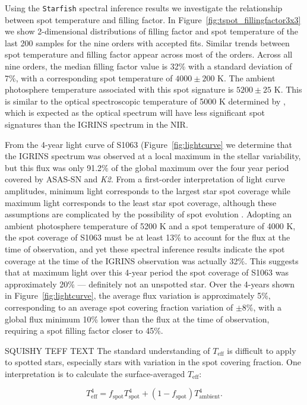 \documentclass[twocolumn]{emulateapj}%
\begin{document}
Using the \texttt{Starfish} spectral inference results we investigate the relationship between spot temperature and filling factor. In Figure~\ref{fig:tspot_fillingfactor3x3} we show 2-dimensional distributions of filling factor and spot temperature of the last 200 samples for the nine orders with accepted fits. Similar trends between spot temperature and filling factor appear across most of the orders. Across all nine orders, the median filling factor value is 32\% with a standard deviation of 7\%, with a corresponding spot temperature of $4000 \pm 200$ K. The ambient photosphere temperature associated with this spot signature is $5200\pm25$ K. This is similar to the optical spectroscopic temperature of 5000 K determined by \citet{mathieu03}, which is expected as the optical spectrum will have less significant spot signatures than the IGRINS spectrum in the NIR.

From the 4-year light curve of S1063 (Figure~\ref{fig:lightcurve} we determine that the IGRINS spectrum was observed at a local maximum in the stellar variability, but this flux was only 91.2\% of the global maximum over the four year period covered by ASAS-SN and \textit{K2}. From a first-order interpretation of light curve amplitudes, minimum light corresponds to the largest star spot coverage while maximum light corresponds to the least star spot coverage, although these assumptions are complicated by the possibility of spot evolution \citep{basri18}. Adopting an ambient photosphere temperature of 5200 K and a spot temperature of 4000 K, the spot coverage of S1063 must be at least 13\% to account for the flux at the time of observation, and yet these spectral inference results indicate the spot coverage at the time of the IGRINS observation was actually 32\%. This suggests that at maximum light over this 4-year period the spot coverage of S1063 was  approximately 20\% --- definitely not an unspotted star. Over the 4-years shown in Figure~\ref{fig:lightcurve}, the average flux variation is approximately 5\%, corresponding to an average spot covering fraction variation of $\pm$8\%, with a global flux minimum 10\% lower than the flux at the time of observation, requiring a spot filling factor closer to 45\%.

SQUISHY TEFF TEXT
The standard understanding of $T_{\textrm{eff}}$ is difficult to apply to spotted stars, especially stars with variation in the spot covering fraction. One interpretation is to calculate the surface-averaged $T_{\textrm{eff}}$:

\begin{equation}
T_{\textrm{eff}}^4 = f_{\textrm{spot}} T_{\textrm{spot}}^4 + (1 -f_{\textrm{spot}}) T_{\textrm{ambient}}^4 .
\end{equation}
\end{document}
